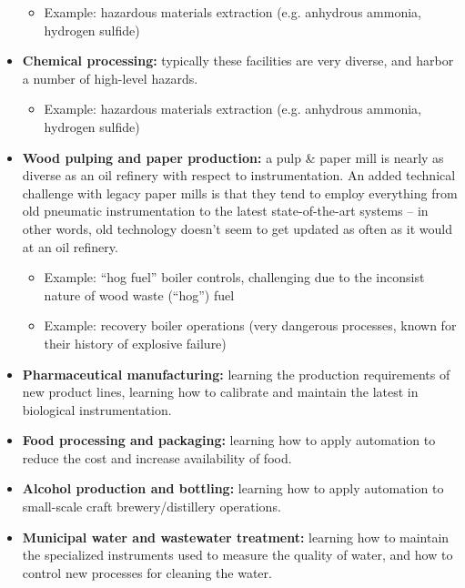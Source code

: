\begin{itemize}
\begin{itemize}
\item{} Example: hazardous materials extraction (e.g. anhydrous ammonia, hydrogen sulfide)
\end{itemize}
\item{} {\bf Chemical processing:} typically these facilities are very diverse, and harbor a number of high-level hazards.
\begin{itemize}

\item{} Example: hazardous materials extraction (e.g. anhydrous ammonia, hydrogen sulfide)
\end{itemize}
\item{} {\bf Wood pulping and paper production:} a pulp \& paper mill is nearly as diverse as an oil refinery with respect to instrumentation.  An added technical challenge with legacy paper mills is that they tend to employ everything from old pneumatic instrumentation to the latest state-of-the-art systems -- in other words, old technology doesn't seem to get updated as often as it would at an oil refinery.
\begin{itemize}

\item{} Example: ``hog fuel'' boiler controls, challenging due to the inconsist nature of wood waste (``hog'') fuel
\item{} Example: recovery boiler operations (very dangerous processes, known for their history of explosive failure)
\end{itemize}
\item{} {\bf Pharmaceutical manufacturing:} learning the production requirements of new product lines, learning how to calibrate and maintain the latest in biological instrumentation.  
\begin{itemize}

\end{itemize}
\item{} {\bf Food processing and packaging:} learning how to apply automation to reduce the cost and increase availability of food.
\begin{itemize}

\end{itemize}
\item{} {\bf Alcohol production and bottling:} learning how to apply automation to small-scale craft brewery/distillery operations.
\begin{itemize}

\end{itemize}
\item{} {\bf Municipal water and wastewater treatment:} learning how to maintain the specialized instruments used to measure the quality of water, and how to control new processes for cleaning the water.
\begin{itemize}


\end{itemize}
\end{itemize}
